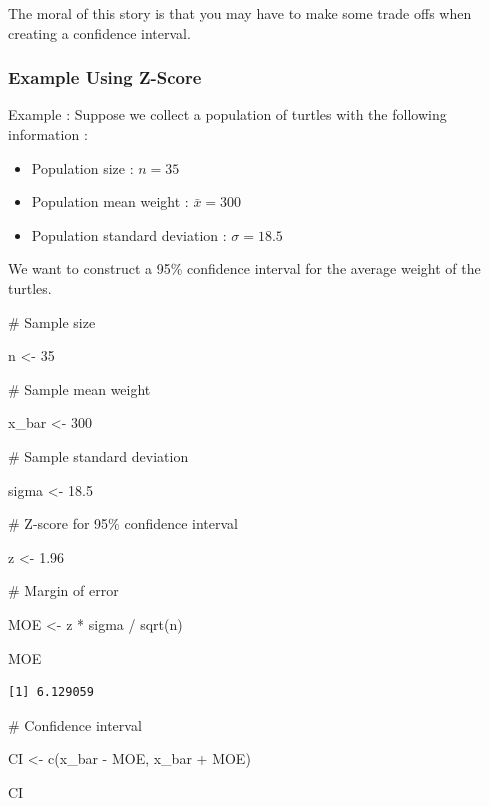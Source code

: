\documentclass[
  letterpaper,
  DIV=11,
  numbers=noendperiod]{scrreprt}
\newenvironment{Shaded}{\begin{snugshade}}{\end{snugshade}}
\newcommand{\CommentTok}[1]{\textcolor[rgb]{0.37,0.37,0.37}{#1}}
\newcommand{\DecValTok}[1]{\textcolor[rgb]{0.68,0.00,0.00}{#1}}
\newcommand{\FloatTok}[1]{\textcolor[rgb]{0.68,0.00,0.00}{#1}}
\newcommand{\FunctionTok}[1]{\textcolor[rgb]{0.28,0.35,0.67}{#1}}
\newcommand{\NormalTok}[1]{\textcolor[rgb]{0.00,0.23,0.31}{#1}}
\newcommand{\OtherTok}[1]{\textcolor[rgb]{0.00,0.23,0.31}{#1}}
\newcommand{\SpecialCharTok}[1]{\textcolor[rgb]{0.37,0.37,0.37}{#1}}
\providecommand{\tightlist}{%
  \setlength{\itemsep}{0pt}\setlength{\parskip}{0pt}}\usepackage{longtable,booktabs,array}
\begin{document}
The moral of this story is that you may have to make some trade offs
when creating a confidence interval.

\subsubsection*{Example Using Z-Score}\label{example-using-z-score}

Example : Suppose we collect a population of turtles with the following
information :

\begin{itemize}
\tightlist
\item
  Population size : \(n=35\)
\item
  Population mean weight : \(\bar{x} = 300\)
\item
  Population standard deviation : \(\sigma = 18.5\)
\end{itemize}

We want to construct a 95\% confidence interval for the average weight
of the turtles.

\begin{Shaded}
\begin{Highlighting}[]
\CommentTok{\# Sample size}

\NormalTok{n }\OtherTok{\textless{}{-}} \DecValTok{35}

\CommentTok{\# Sample mean weight}

\NormalTok{x\_bar }\OtherTok{\textless{}{-}} \DecValTok{300}

\CommentTok{\# Sample standard deviation}

\NormalTok{sigma }\OtherTok{\textless{}{-}} \FloatTok{18.5}

\CommentTok{\# Z{-}score for 95\% confidence interval}

\NormalTok{z }\OtherTok{\textless{}{-}} \FloatTok{1.96}

\CommentTok{\# Margin of error}

\NormalTok{MOE }\OtherTok{\textless{}{-}}\NormalTok{ z }\SpecialCharTok{*}\NormalTok{ sigma }\SpecialCharTok{/} \FunctionTok{sqrt}\NormalTok{(n)}

\NormalTok{MOE}
\end{Highlighting}
\end{Shaded}

\begin{verbatim}
[1] 6.129059
\end{verbatim}

\begin{Shaded}
\begin{Highlighting}[]
\CommentTok{\# Confidence interval}

\NormalTok{CI }\OtherTok{\textless{}{-}} \FunctionTok{c}\NormalTok{(x\_bar }\SpecialCharTok{{-}}\NormalTok{ MOE, x\_bar }\SpecialCharTok{+}\NormalTok{ MOE)}

\NormalTok{CI}
\end{Highlighting}
\end{Shaded}
\end{document}

